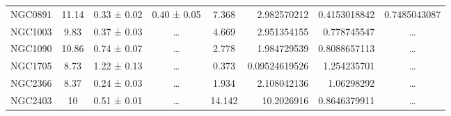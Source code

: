 \documentclass[reprint,%
 amsmath,amssymb,
 aps,
]{revtex4-1}
\begin{document}
\begin{table}[]
\begin{tabular}{cccccrrc}
\rowcolor[HTML]{F3F3F3} 
NGC0891              & 11.14                     & 0.33 ± 0.02           & 0.40 ± 0.05            & 7.368                                                        & 2.982570212                                                           & 0.4153018842                                                          & \multicolumn{1}{r}{\cellcolor[HTML]{F3F3F3}0.7485043087}      \\
\rowcolor[HTML]{F3F3F3} 
NGC1003              & 9.83                      & 0.37 ± 0.03           & …                      & 4.669                                                        & 2.951354155                                                           & 0.778745547                                                           & …                                                             \\
\rowcolor[HTML]{F3F3F3} 
NGC1090              & 10.86                     & 0.74 ± 0.07           & …                      & 2.778                                                        & 1.984729539                                                           & 0.8088657113                                                          & …                                                             \\
\rowcolor[HTML]{F3F3F3} 
NGC1705              & 8.73                      & 1.22 ± 0.13           & …                      & 0.373                                                        & 0.09524619526                                                         & 1.254235701                                                           & …                                                             \\
\rowcolor[HTML]{F3F3F3} 
NGC2366              & 8.37                      & 0.24 ± 0.03           & …                      & 1.934                                                        & 2.108042136                                                           & 1.06298292                                                            & …                                                             \\
\rowcolor[HTML]{F3F3F3} 
NGC2403              & 10                        & 0.51 ± 0.01           & …                      & 14.142                                                       & 10.2026916                                                            & 0.8646379911                                                          & …                                                             \\

\end{tabular}
\end{table}
\end{document}
